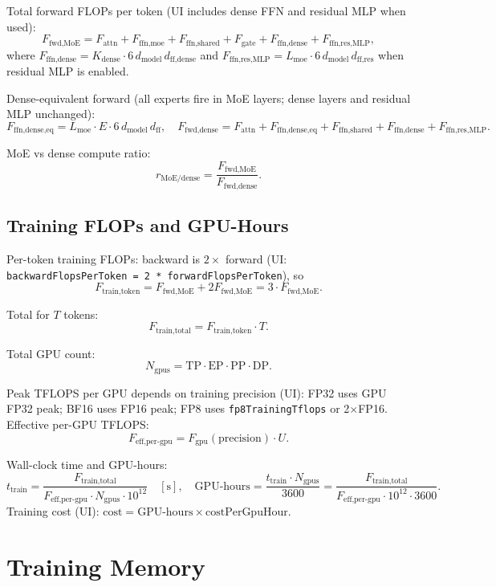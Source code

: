 \documentclass[11pt]{article}
\begin{document}
Total forward FLOPs per token (UI includes dense FFN and residual MLP when used):
\[
F_{\text{fwd,MoE}} = F_{\text{attn}} + F_{\text{ffn,moe}} + F_{\text{ffn,shared}} + F_{\text{gate}}
+ F_{\text{ffn,dense}} + F_{\text{ffn,res,MLP}},
\]
where $F_{\text{ffn,dense}} = K_{\text{dense}} \cdot 6 \, d_{\text{model}} \, d_{\text{ff,dense}}$ and
$F_{\text{ffn,res,MLP}} = L_{\text{moe}} \cdot 6 \, d_{\text{model}} \, d_{\text{ff,res}}$ when residual MLP is enabled.

Dense-equivalent forward (all experts fire in MoE layers; dense layers and residual MLP unchanged):
\[
F_{\text{ffn,dense,eq}} = L_{\text{moe}} \cdot E \cdot 6 \, d_{\text{model}} \, d_{\text{ff}},
\quad
F_{\text{fwd,dense}} =
F_{\text{attn}} + F_{\text{ffn,dense,eq}} + F_{\text{ffn,shared}} + F_{\text{ffn,dense}} + F_{\text{ffn,res,MLP}}.
\]

MoE vs dense compute ratio:
\[
r_{\text{MoE/dense}} = \frac{F_{\text{fwd,MoE}}}{F_{\text{fwd,dense}}}.
\]

\subsection{Training FLOPs and GPU-Hours}

Per-token training FLOPs: backward is $2 \times$ forward (UI: \texttt{backwardFlopsPerToken = 2 * forwardFlopsPerToken}), so
\[
F_{\text{train,token}} = F_{\text{fwd,MoE}} + 2 F_{\text{fwd,MoE}} = 3 \cdot F_{\text{fwd,MoE}}.
\]

Total for $T$ tokens:
\[
F_{\text{train,total}} = F_{\text{train,token}} \cdot T.
\]

Total GPU count:
\[
N_{\text{gpus}} = \mathrm{TP} \cdot \mathrm{EP} \cdot \mathrm{PP} \cdot \mathrm{DP}.
\]

Peak TFLOPS per GPU depends on training precision (UI): FP32 uses GPU FP32 peak; BF16 uses FP16 peak; FP8 uses \texttt{fp8TrainingTflops} or 2$\times$FP16. Effective per-GPU TFLOPS:
\[
F_{\text{eff,per-gpu}} = F_{\text{gpu}}(\text{precision}) \cdot U.
\]

Wall-clock time and GPU-hours:
\[
t_{\text{train}} = \frac{F_{\text{train,total}}}{F_{\text{eff,per-gpu}} \cdot N_{\text{gpus}} \cdot 10^{12}}
\quad [\text{s}],
\quad
\text{GPU-hours} = \frac{t_{\text{train}} \cdot N_{\text{gpus}}}{3600}
= \frac{F_{\text{train,total}}}{F_{\text{eff,per-gpu}} \cdot 10^{12} \cdot 3600}.
\]
Training cost (UI): $\text{cost} = \text{GPU-hours} \times \text{costPerGpuHour}$.

\section{Training Memory}
\end{document}
